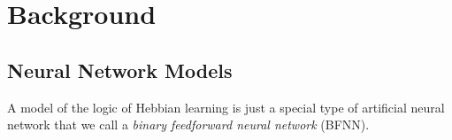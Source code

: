 \documentclass[letterpaper]{article}
\theoremstyle{definition}
\newcommand{\set}[1]{\{ #1 \}}
\newcommand{\Net}{\mathcal{N}}
\begin{document}
\section{Background}

\subsection{Neural Network Models}

A model of the logic of Hebbian learning is just a special type of artificial neural network that we call a \emph{binary feedforward neural network} (BFNN).



\end{document}
